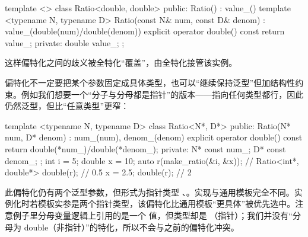 \begin{code}
template <> class Ratio<double, double> {
  public:
  Ratio() : value_() {}
  template <typename N, typename D>
    Ratio(const N& num, const D& denom) :
      value_(double(num)/double(denom)) {}
  explicit operator double() const { return value_; }
  private:
  double value_;
};
\end{code}

这样偏特化之间的歧义被全特化“覆盖”，由全特化接管该实例。

偏特化不一定要把某个参数固定成具体类型，也可以“继续保持泛型”但加结构性约束。例如我们想要一个“分子与分母都是指针”的版本——指向任何类型都行，因此仍然泛型，但比“任意类型”更窄：

\begin{code}
template <typename N, typename D> class Ratio<N*, D*> {
  public:
  Ratio(N* num, D* denom) : num_(num), denom_(denom) {}
  explicit operator double() const {
    return double(*num_)/double(*denom_);
  }
  private:
  N* const num_;
  D* const denom_;
};
int i = 5; double x = 10;
auto r(make_ratio(&i, &x));        // Ratio<int*, double*>
double(r);                    // 0.5
x = 2.5;
double(r);                    // 2
\end{code}

此偏特化仍有两个泛型参数，但形式为指针类型 、。实现与通用模板完全不同。实例化时若模板实参是两个指针类型，该偏特化比通用模板“更具体”被优先选中。注意例子里分母变量逻辑上引用的是一个  值，但类型却是 （指针）；我们并没有“分母为 double（非指针）”的特化，所以不会与之前的偏特化冲突。

